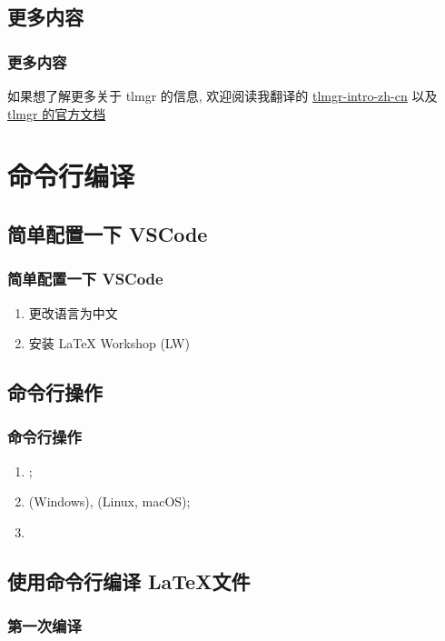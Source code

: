 \subsection{更多内容}

\begin{frame}
  \frametitle{更多内容}
  如果想了解更多关于 tlmgr 的信息, 欢迎阅读我翻译的 \href{http://mirrors.ctan.org/info/tlmgr-intro-zh-cn/tlmgr-intro-zh-cn.pdf}{tlmgr-intro-zh-cn} 以及 \href{https://www.tug.org/texlive/doc/tlmgr.html}{tlmgr 的官方文档}
\end{frame}

\section{命令行编译}

\subsection{简单配置一下 VSCode}

\begin{frame}
  \frametitle{简单配置一下 VSCode}
  \begin{enumerate}[<+->]
    \item 更改语言为中文
    \item 安装 LaTeX Workshop (LW)
  \end{enumerate}
\end{frame}

\subsection{命令行操作}

\begin{frame}[fragile]
  \frametitle{命令行操作}
  \begin{enumerate}[<+->]
    \item {};
    \item {} (Windows),  (Linux, macOS);
    \item {}
  \end{enumerate}
\end{frame}

\subsection{使用命令行编译 \LaTeX 文件}
\subsubsection{第一次编译}

